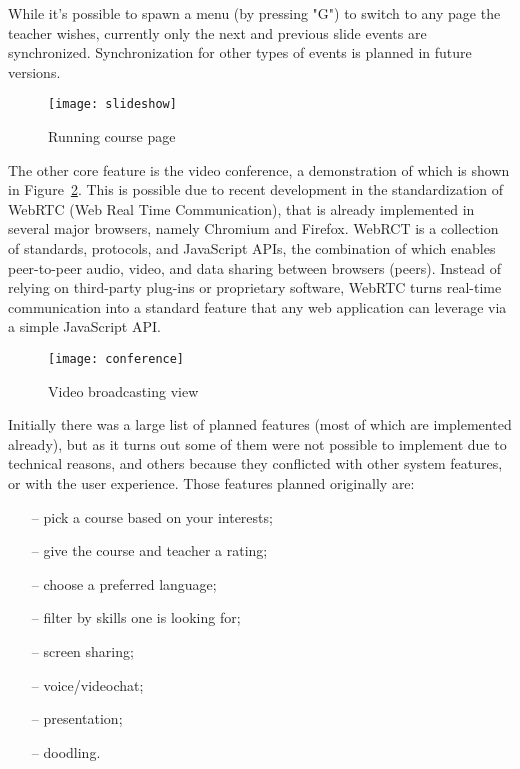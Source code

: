 While it's possible to spawn a menu (by
pressing "G") to switch to any page the teacher wishes, currently only the
next and previous slide events are synchronized. Synchronization for other types
of events is planned in future versions.
\begin{figure}[ht!]
\centering
\texttt{[image: slideshow]}
\caption{Running course page}
\label{fig:slideshow}
\end{figure}
The other core feature is the video conference, a demonstration of which is shown in Figure~\ref{fig:conference}.
This is possible due to recent development in
the standardization of WebRTC (Web Real Time Communication), that is already
implemented in several major browsers, namely Chromium and Firefox.  WebRCT is a
collection of standards, protocols, and JavaScript APIs, the combination of
which enables peer-to-peer audio, video, and data sharing between browsers
(peers). Instead of relying on third-party plug-ins or proprietary software,
WebRTC turns real-time communication into a standard feature that any web
application can leverage via a simple JavaScript API.
\begin{figure}[ht!]
\centering
\texttt{[image: conference]}
\caption{Video broadcasting view}
\label{fig:conference}
\end{figure}

Initially there was a large list of planned features (most of which are implemented already), but as it
turns out some of them were not possible to implement due to technical reasons, and others because they
conflicted with other system features, or with the user experience. Those features planned originally are:
\begin{enumerate}[topsep=5pt, partopsep=0pt,itemsep=3pt,parsep=1pt]
    \item[--] pick a course based on your interests;
    \item[--] give the course and teacher a rating;
    \item[--] choose a preferred language;
    \item[--] filter by skills one is looking for;
    \item[--] screen sharing;
    \item[--] voice/videochat;
    \item[--] presentation;
    \item[--] doodling.
\end{enumerate}

